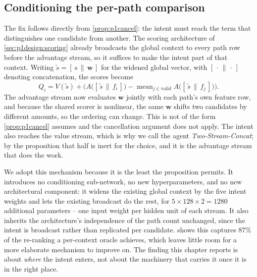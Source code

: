 \subsection{Conditioning the per-path comparison}
\label{sec:p1design:perpath}
The fix follows directly from \cref{prop:p1cancel}: the intent must reach the term that distinguishes
one candidate from another. The scoring architecture of \cref{sec:p1design:scoring} already broadcasts
the global context to every path row before the advantage stream, so it suffices to make the intent part
of that context. Writing $\tilde{s} = [\,s \,\|\, \mathbf{w}\,]$ for the widened global vector, with
$[\,\cdot\,\|\,\cdot\,]$ denoting concatenation, the scores become
\begin{equation}
Q_i = V(\tilde{s}) + \Big(A\big([\,\tilde{s} \,\|\, f_i\,]\big)
      - \operatorname{mean}_{j \in \text{valid}} A\big([\,\tilde{s} \,\|\, f_j\,]\big)\Big).
\label{eq:p1cond}
\end{equation}
The advantage stream now evaluates $\mathbf{w}$ jointly with each path's own feature row, and because the
shared scorer is nonlinear, the same $\mathbf{w}$ shifts two candidates by different amounts, so the
ordering can change. This is not of the form \cref{prop:p1cancel} assumes and the cancellation argument
does not apply. The intent also reaches the value stream, which is why we call the agent
\emph{Two-Stream-Concat}; by the proposition that half is inert for the choice, and it is the advantage
stream that does the work.

We adopt this mechanism because it is the least the proposition permits. It introduces no conditioning
sub-network, no new hyperparameters, and no new architectural component: it widens the existing global
context by the five intent weights and lets the existing broadcast do the rest, for
$5 \times 128 \times 2 = 1280$ additional parameters -- one input weight per hidden unit of each stream.
It also inherits the architecture's independence of the path count unchanged, since the intent is
broadcast rather than replicated per candidate.  shows this captures 87\% of
the re-ranking a per-context oracle achieves, which leaves little room for a more elaborate mechanism to
improve on. The finding this chapter reports is about \emph{where} the intent enters, not about the
machinery that carries it once it is in the right place.

